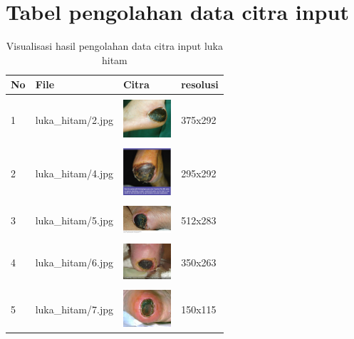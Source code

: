 \chapter{Tabel pengolahan data citra input}

\begin{table}[H]
	\centering
	\caption{Visualisasi hasil pengolahan data citra input luka hitam}
	\label{tabel_input}
	\begin{tabular}{|m{0.2in}|m{1.2in}|m{0.7in}|m{0.7in}|}
		\hline
		\textbf{No} & \textbf{File} & \textbf{Citra} & \textbf{resolusi} \\
		\hline
		
		& &  &  \\
		1 & 
		luka\_hitam/2.jpg &
		\includegraphics[width=0.7in]{gambar/dataset_citra/luka_hitam/2.jpg}&
		375x292\\
		\hline
		
		& &  &  \\
		2 & 
		luka\_hitam/4.jpg &
		\includegraphics[width=0.7in]{gambar/dataset_citra/luka_hitam/4.jpg}&
		295x292\\
		\hline
		
		& &  &  \\
		3 & 
		luka\_hitam/5.jpg &
		\includegraphics[width=0.7in]{gambar/dataset_citra/luka_hitam/5.jpg}&
		512x283\\
		\hline
		
		& &  &  \\
		4& 
		luka\_hitam/6.jpg &
		\includegraphics[width=0.7in]{gambar/dataset_citra/luka_hitam/6.jpg}&
		350x263\\
		\hline
		
		& &  &  \\
		5& 
		luka\_hitam/7.jpg &
		\includegraphics[width=0.7in]{gambar/dataset_citra/luka_hitam/7.jpg}&
		150x115\\
		\hline
		

\end{tabular}
\end{table}
